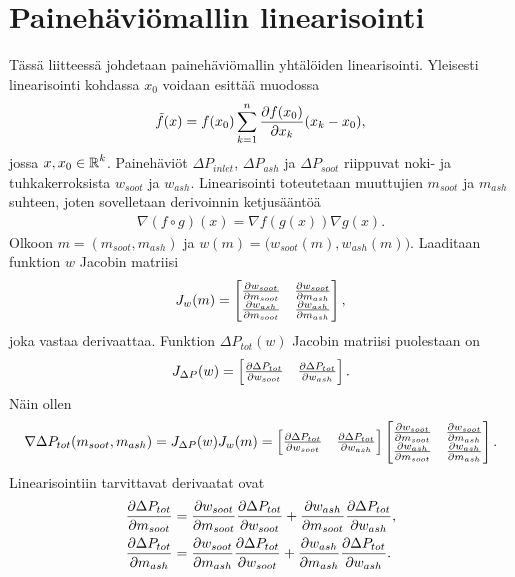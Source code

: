 
\chapter{Painehäviömallin linearisointi}%
\label{ch:linearisointi}

Tässä liitteessä johdetaan painehäviömallin yhtälöiden linearisointi. Yleisesti linearisointi kohdassa \(x_0\) voidaan esittää muodossa
\begin{align}
    \tilde{f}(x) = f(x_0) \sum_{k=1}^n \frac{\partial f(x_0)}{\partial x_k} (x_k-x_0),
\end{align}
jossa \(x, x_0 \in \operatorname{\mathbb{R}}^k\). 
Painehäviöt \(\Delta P_{inlet}\), \(\Delta P_{ash}\) ja \(\Delta P_{soot}\) riippuvat noki- ja tuhkakerroksista \(w_{soot}\) ja \(w_{ash}\). 
Linearisointi toteutetaan muuttujien \(m_{soot}\) ja \( m_{ash}\) suhteen, joten
sovelletaan derivoinnin ketjusääntöä
\begin{align}
    \nabla (f \circ g)(x) = \nabla f(g(x))\nabla g(x).
\end{align}
Olkoon \(m = \left(m_{soot}, m_{ash}\right)\) ja \(w(m) = \big(w_{soot}(m), w_{ash}(m)  \big)\). Laaditaan funktion \(w\) Jacobin matriisi
\begin{align}
    J_w(m)=
    \begin{bmatrix} 
        \frac{\partial w_{soot}}{\partial m_{soot}} & \frac{\partial w_{soot}}{\partial m_{ash}}
    \\  \frac{\partial w_{ash}}{\partial m_{soot}} & \frac{\partial w_{ash}}{\partial m_{ash}}
     \end{bmatrix},
\end{align}
joka vastaa derivaattaa. Funktion \(\Delta P_{tot}(w)\) Jacobin matriisi puolestaan on 
\begin{align}
    J_{\Delta P}(w) = \begin{bmatrix}   \frac{\partial \Delta P_{tot}}{\partial w_{soot}}
    &   \frac{\partial \Delta P_{tot}}{\partial w_{ash}}
     \end{bmatrix}.
\end{align}
Näin ollen 
\begin{align}
    \nabla \Delta P_{tot}(m_{soot}, m_{ash})=
    J_{\Delta P}(w)  J_{w}(m)
    =
    \begin{bmatrix}   \frac{\partial \Delta P_{tot}}{\partial w_{soot}}
        &   \frac{\partial \Delta P_{tot}}{\partial w_{ash}}
         \end{bmatrix}
    \begin{bmatrix} 
        \frac{\partial w_{soot}}{\partial m_{soot}} & \frac{\partial w_{soot}}{\partial m_{ash}}
    \\  \frac{\partial w_{ash}}{\partial m_{soot}} & \frac{\partial w_{ash}}{\partial m_{ash}}
     \end{bmatrix}.
\end{align}
Linearisointiin tarvittavat derivaatat ovat 
\begin{align}
    \frac{\partial \Delta P_{tot}}{\partial m_{soot}} &=
        \frac{\partial w_{soot}}{\partial m_{soot}}
        \frac{\partial \Delta P_{tot}}{\partial w_{soot}}
        +
        \frac{\partial w_{ash}}{\partial m_{soot}}
        \frac{\partial \Delta P_{tot}}{\partial w_{ash}},
    \\
    \frac{\partial \Delta P_{tot}}{\partial m_{ash}} &=
        \frac{\partial w_{soot}}{\partial m_{ash}}
        \frac{\partial \Delta P_{tot}}{\partial w_{soot}}
        +
        \frac{\partial w_{ash}}{\partial m_{ash}}
        \frac{\partial \Delta P_{tot}}{\partial w_{ash}}.
\end{align}

